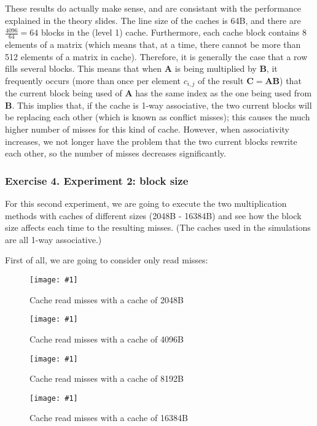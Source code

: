 \documentclass{article}
\newcommand{\myFigure}[4]{%
    \begin{figure}[!ht]
        \texttt{[image: \#1]}
        \centering
        \caption{#2}
        \label{#3}
    \end{figure}
}
\begin{document}
These results do actually make sense, and are consistant with the performance explained in the theory slides. The line size of the caches is 64B, and there are $\frac{4096}{64}=64$ blocks in the (level 1) cache. 
Furthermore, each cache block contains 8 elements of a matrix (which means that, at a time, there cannot be more than 512 elements of a matrix in cache). Therefore, it is generally the case that a row fills several blocks.
This means that when $\mathbf{A}$ is being multiplied by $\mathbf{B}$, it frequently occurs (more than once per element $c_{i,j}$ of the result $\mathbf{C}=\mathbf{AB}$) that the current block being used of $\mathbf{A}$ has the same index as the one being used from $\mathbf{B}$. This implies that, if the cache is 1-way associative, the two current blocks will be replacing each other (which is known as conflict misses); this causes the much higher number of misses for this kind of cache. However, when associativity increases, we not longer have the problem that the two current blocks rewrite each other, so the number of misses decreases significantly.


\pagebreak

\subsubsection*{Exercise 4. Experiment 2: block size}


For this second experiment, we are going to execute the two multiplication methods with caches of different sizes (2048B - 16384B) and see how the block size affects each time to the resulting misses. (The caches used in the simulations are all 1-way associative.)

First of all, we are going to consider only read misses:


\myFigure{../material_P3/protect_out4/BlockSize_2048/cache_lectura.png}{Cache read misses with a cache of 2048B}{block_2048_lec}{0.52}


\myFigure{../material_P3/protect_out4/BlockSize_4096/cache_lectura.png}{Cache read misses with a cache of 4096B}{block_4096_lec}{0.52}

\myFigure{../material_P3/protect_out4/BlockSize_8192/cache_lectura.png}{Cache read misses with a cache of 8192B}{block_8192B_lec}{0.52}

\myFigure{../material_P3/protect_out4/BlockSize_16384/cache_lectura.png}{Cache read misses with a cache of 16384B}{block_16384B_lec}{0.52}
\end{document}
